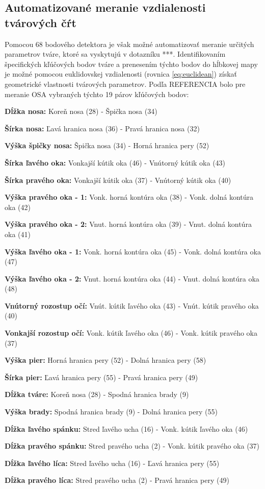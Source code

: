 \subsection{Automatizované meranie vzdialenosti tvárových čŕt}
Pomocou 68 bodového detektora je však možné automatizovať meranie určitých parametrov tváre, ktoré sa vyskytujú v dotazníku ***. 
Identifikovaním špecifických kľúčových bodov tváre a prenesením týchto bodov do hĺbkovej mapy je možné pomocou euklidovskej vzdialenosti (rovnica \ref{eq:euclidean}) získať geometrické vlastnosti tvárových parametrov.
Podľa REFERENCIA bolo pre meranie OSA vybraných týchto 19 párov kľúčových bodov: 
\vskip 0.2in

\begin{compactitem}
	\item[\textbf{Dĺžka nosa:}] Koreň nosa (28) - Špička nosa (34)
	\item[\textbf{Šírka nosa:}] Ľavá hranica nosa (36) - Pravá hranica nosa (32)
	\item[\textbf{Výška špičky nosa:}] Špička nosa (34) - Horná hranica pery (52)
	\item[\textbf{Šírka ľavého oka:}] Vonkajší kútik oka (46) - Vnútorný kútik oka (43)
	\item[\textbf{Šírka pravého oka:}] Vonkajší kútik oka (37) - Vnútorný kútik oka (40)
	\item[\textbf{Výška pravého oka - 1:}] Vonk. horná kontúra oka (38) - Vonk. dolná kontúra oka (42)
	\item[\textbf{Výška pravého oka - 2:}] Vnut. horná kontúra oka (39) - Vnut. dolná kontúra oka (41)
	\item[\textbf{Výška ľavého oka - 1:}] Vonk. horná kontúra oka (45) - Vonk. dolná kontúra oka (47)
	\item[\textbf{Výška ľavého oka - 2:}] Vnut. horná kontúra oka (44) - Vnut. dolná kontúra oka (48)
	\item[\textbf{Vnútorný rozostup očí:}] Vnút. kútik ľavého oka (43) - Vnút. kútik pravého oka (40)
	\item[\textbf{Vonkajší rozostup očí:}] Vonk. kútik ľavého oka (46) - Vonk. kútik pravého oka (37)
	\item[\textbf{Výška pier:}] Horná hranica pery (52) - Dolná hranica pery (58)
	\item[\textbf{Šírka pier:}] Ľavá hranica pery (55) - Pravá hranica pery (49)
	\item[\textbf{Dĺžka tváre:}] Koreň nosa (28) - Spodná hranica brady (9)
	\item[\textbf{Výška brady:}] Spodná hranica brady (9) - Dolná hranica pery (55)
	\item[\textbf{Dĺžka ľavého spánku:}] Stred ľavého ucha (16) - Vonk. kútik ľavého oka (46)
	\item[\textbf{Dĺžka pravého spánku:}] Stred pravého ucha (2) - Vonk. kútik pravého oka (37)
	\item[\textbf{Dĺžka ľavého líca:}] Stred ľavého ucha (16) - Ľavá hranica pery (55)
	\item[\textbf{Dĺžka pravého líca:}] Stred pravého ucha (2) - Pravá hranica pery (49)
\end{compactitem}

